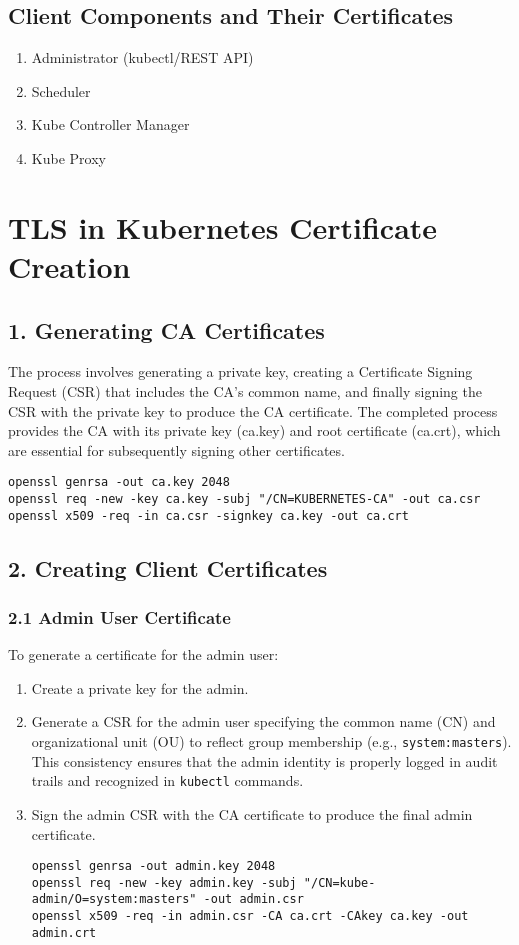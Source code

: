 \documentclass[11pt]{article}
\begin{document}
\subsection{Client Components and Their Certificates}
\label{sec:org8e1db3c}

\begin{enumerate}
\item Administrator (kubectl/REST API)
\item Scheduler
\item Kube Controller Manager
\item Kube Proxy
\end{enumerate}
\section{TLS in Kubernetes Certificate Creation}
\label{sec:org3cb86dc}
\subsection{1. Generating CA Certificates}
\label{sec:orge713024}
The process involves generating a private key, creating a Certificate Signing Request (CSR) that includes the CA's common name, and finally signing the CSR with the private key to produce the CA certificate. The completed process provides the CA with its private key (ca.key) and root certificate (ca.crt), which are essential for subsequently signing other certificates.

\begin{verbatim}
openssl genrsa -out ca.key 2048
openssl req -new -key ca.key -subj "/CN=KUBERNETES-CA" -out ca.csr
openssl x509 -req -in ca.csr -signkey ca.key -out ca.crt
\end{verbatim}
\subsection{2. Creating Client Certificates}
\label{sec:org78bc9af}
\subsubsection{2.1 Admin User Certificate}
\label{sec:org9341168}
To generate a certificate for the admin user:

\begin{enumerate}
\item Create a private key for the admin.
\item Generate a CSR for the admin user specifying the common name (CN) and organizational unit (OU) to reflect group membership (e.g., \texttt{system:masters}). This consistency ensures that the admin identity is properly logged in audit trails and recognized in \texttt{kubectl} commands.
\item Sign the admin CSR with the CA certificate to produce the final admin certificate.

\begin{verbatim}
openssl genrsa -out admin.key 2048
openssl req -new -key admin.key -subj "/CN=kube-admin/O=system:masters" -out admin.csr
openssl x509 -req -in admin.csr -CA ca.crt -CAkey ca.key -out admin.crt
\end{verbatim}
\end{enumerate}
\end{document}
